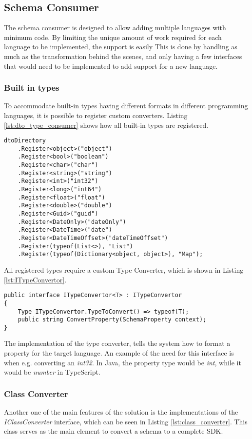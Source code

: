 \subsection{Schema Consumer}
The schema consumer is designed to allow adding multiple languages with minimum code.
By limiting the unique amount of work required for each language to be implemented, the support is easily
This is done by handling as much as the transformation behind the scenes, and only having a few interfaces that would need to be implemented to add support for a new language.

\subsubsection{Built in types \label{sec:implementation:built_in_types}}
To accommodate built-in types having different formats in different programming languages, it is possible to register custom converters. Listing \ref{lst:dto_type_consumer} shows how all built-in types are registered.
\begin{lstlisting}[caption={Schema types to C\# mapping}, label={lst:dto_type_consumer}, style=base_csharp]
dtoDirectory
    .Register<object>("object")
    .Register<bool>("boolean")
    .Register<char>("char")
    .Register<string>("string")
    .Register<int>("int32")
    .Register<long>("int64")
    .Register<float>("float")
    .Register<double>("double")
    .Register<Guid>("guid")
    .Register<DateOnly>("dateOnly")
    .Register<DateTime>("date")
    .Register<DateTimeOffset>("dateTimeOffset")
    .Register(typeof(List<>), "List")
    .Register(typeof(Dictionary<object, object>), "Map");
\end{lstlisting}
All registered types require a custom Type Converter, which is shown in Listing \ref{lst:ITypeConvertor}.
\begin{lstlisting}[caption={ITypeConvertor interface}, label={lst:ITypeConvertor}, style=base_csharp]
public interface ITypeConvertor<T> : ITypeConvertor
{
    Type ITypeConvertor.TypeToConvert() => typeof(T);
    public string ConvertProperty(SchemaProperty context);
}
\end{lstlisting}
\noindent
The implementation of the type converter, tells the system how to format a property for the target language.
An example of the need for this interface is when e.g. converting an \textit{int32}. In Java, the property type would be \textit{int}, while it would be \textit{number} in TypeScript.

\subsubsection{Class Converter}
Another one of the main features of the solution is the implementations of the \textit{IClassConverter} interface, which can be seen in Listing \ref{lst:class_converter}.
This class serves as the main element to convert a schema to a complete SDK.

